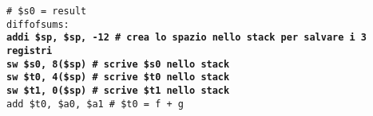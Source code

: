 \documentclass[../main.tex]{subfiles}
\begin{document}
\texttt{\# \$s0 = result \\
    diffofsums: \\
    \textbf{\hspace*{0cm} \hspace*{0cm} \hspace*{0cm} \hspace*{0cm} addi \$sp, \$sp, -12 \hspace*{0cm} \# crea lo spazio nello stack per salvare i 3 registri} \\
    \textbf{\hspace*{0cm} \hspace*{0cm} \hspace*{0cm} \hspace*{0cm} sw \$s0, 8(\$sp) \hspace*{0cm} \hspace*{0cm} \hspace*{0cm} \hspace*{0cm} \hspace*{0cm} \# scrive \$s0 nello stack} \\
    \textbf{\hspace*{0cm} \hspace*{0cm} \hspace*{0cm} \hspace*{0cm} sw \$t0, 4(\$sp) \hspace*{0cm} \hspace*{0cm} \hspace*{0cm} \hspace*{0cm} \hspace*{0cm} \# scrive \$t0 nello stack} \\
    \textbf{\hspace*{0cm} \hspace*{0cm} \hspace*{0cm} \hspace*{0cm} sw \$t1, 0(\$sp) \hspace*{0cm} \hspace*{0cm} \hspace*{0cm} \hspace*{0cm} \hspace*{0cm} \# scrive \$t1 nello stack} \\
    \hspace*{0cm} \hspace*{0cm} \hspace*{0cm} \hspace*{0cm} add \$t0, \$a0, \$a1 \hspace*{0cm} \hspace*{0cm} \# \$t0 = f + g \\
}
\end{document}

